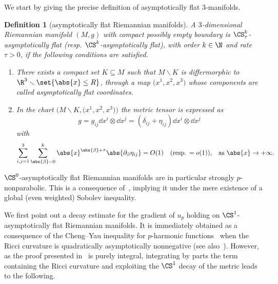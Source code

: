 \documentclass[10pt,a4paper]{amsart}
\numberwithin{equation}{section}
\newtheorem{Definition}[Theorem]{Definition}
\newcommand{\eum}{\delta}
\begin{document}
We start by giving the precise definition of asymptotically flat $3$-manifolds.
\begin{Definition}[asymptotically flat Riemannian manifolds] %
A $3$-dimensional Riemannian manifold $(M,g)$ with compact possibly empty boundary is \emph{$\CS^{k}_\tau$-asymptotically flat} \big(resp. \emph{$\CS^{k}$-asymp\-tot\-ically flat}\big), with order $k\in \N$ and rate $\tau >0$, if the following conditions are satisfied.
\begin{enumerate}\itemsep=0pt
 \item There exists a compact set $K \subseteq M$ such that $M \smallsetminus K$ is differmorphic to $\R^3\smallsetminus \set{\abs{x}\leq R}$, through a map $\big(x^1,x^2,x^3\big)$ whose components are called \emph{asymptotically flat coordinates}.
 \item In the chart $\big(M \smallsetminus K, \big(x^1,x^2,x^3\big)\big)$ the metric tensor is expressed as
 \[
 g= g_{ij} \dd x^i \otimes\dd x^j= (\eum_{ij}+\eta_{ij}) \dd x^i \otimes\dd x^j
 \]
 with
 \[
 \sum_{i,j=1}^{3}\sum_{\abs{\beta}=0}^k \abs{x}^{\abs{\beta}+\tau} \abs{ \partial_\beta \eta_{ij}} =O(1) \quad \text{(resp. $=o(1)$), \ \ as $\abs{x} \to +\infty$.}
 \]
\end{enumerate}
\end{Definition}

$\CS^0$-asymptotically flat Riemannian manifolds are in particular strongly $p$-nonparabolic. This is a consequence of~\cite[Theorem 3.6]{mari_flowlaplaceapproximationnew_2022}, implying it under the mere existence of a global (even weighted) Sobolev inequality.

We first point out a decay estimate for the gradient of $u_p$ holding on $\CS^1$-asymptotically flat Riemannian manifolds. It is immediately obtained as a consequence of the Cheng--Yau inequality for $p$-harmonic functions~\cite{wang_localgradientestimateharmonic_2010} when the Ricci curvature is quadratically asymptotically nonnegative (see also~\cite[Proposition 2.27]{benatti_asymptoticbehaviourcapacitarypotentials_2022}). However, as the proof presented in~\cite{wang_localgradientestimateharmonic_2010} is purely integral, integrating by parts the term containing the Ricci curvature and exploiting the $\CS^1$ decay of the metric leads to the following.
\end{document}
